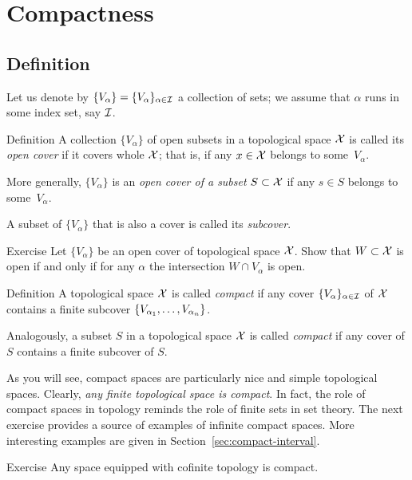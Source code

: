 \chapter{Compactness}

\section{Definition}

Let us denote by $\{V_\alpha\}=\{V_\alpha\}_{\alpha\in \mathcal{I}}$ a collection of sets;
we assume that $\alpha$ runs in some index set, say $\mathcal{I}$.

\begin{thm}{Definition}
A collection $\{V_\alpha\}$ of open subsets in a topological space $\mathcal{X}$ is called its \emph{open cover} if it covers whole $\mathcal{X}$;
that is, if any $x\in \mathcal{X}$ belongs to some~$V_\alpha$.

More generally, $\{V_\alpha\}$ is an \emph{open cover of a subset} $S\subset \mathcal{X}$ if any $s\in S$ belongs to some~$V_\alpha$.

A subset of $\{V_\alpha\}$ that is also a cover is called its \emph{subcover}.
\end{thm}

\begin{thm}{Exercise}
Let $\{V_\alpha\}$ be an open cover of topological space $\mathcal{X}$.
Show that $W\subset \mathcal{X}$ is open if and only if for any $\alpha$ the intersection $W\cap V_\alpha$ is open.  
\end{thm}

\begin{thm}{Definition}
A topological space $\mathcal{X}$ is called \emph{compact} if any cover $\{V_\alpha\}_{\alpha\in\mathcal{I}}$ of $\mathcal{X}$
contains a finite subcover $\{V_{\alpha_1},\z\dots,V_{\alpha_n}\}$.

Analogously, a subset $S$ in a topological space $\mathcal{X}$ is called \emph{compact} if any cover of $S$
contains a finite subcover of $S$.
\end{thm}

As you will see, compact spaces are particularly nice and simple topological spaces.
Clearly, \textit{any finite topological space is compact}.
In fact, the role of compact spaces in topology reminds the role of finite sets in set theory.
The next exercise provides a source of examples of infinite compact spaces.
More interesting examples are given in Section~\ref{sec:compact-interval}.

\begin{thm}{Exercise}
Any space equipped with cofinite topology is compact. 
\end{thm}

